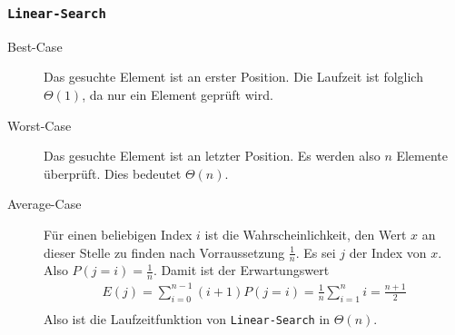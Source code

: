 \documentclass[11pt]{article}
\begin{document}
  \subsubsection*{\texttt{Linear-Search}}
    \begin{description}
      \item[Best-Case] Das gesuchte Element ist an erster Position. Die Laufzeit
        ist folglich $\Theta(1)$, da nur ein Element gepr\"uft wird.

      \item[Worst-Case] Das gesuchte Element ist an letzter Position. Es werden
        also $n$ Elemente \"uberpr\"uft. Dies bedeutet $\Theta(n)$.
        
      \item[Average-Case] 
        F\"ur einen beliebigen Index $i$ ist die Wahrscheinlichkeit, den 
        Wert $x$ an dieser Stelle zu finden nach Vorraussetzung $\frac{1}{n}$.
        Es sei $j$ der Index von $x$.  Also $P(j=i) = \frac{1}{n}$. 
        Damit ist der Erwartungswert 
        \begin{align*}
          E(j)  = \sum_{i=0}^{n-1} (i + 1) P(j=i) = \frac{1}{n} \sum_{i=1}^{n} i 
                                                  = \frac{n + 1}{2} \\
        \end{align*}
        Also ist die Laufzeitfunktion von \texttt{Linear-Search} in 
        $\Theta(n)$.

    \end{description}
\end{document}
